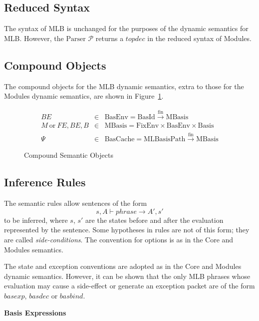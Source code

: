 \documentclass[draft]{article}
\renewcommand{\mit}[1]{\mathit{#1}}
\newcommand{\mrm}[1]{\mathrm{#1}}
\newcommand{\mcal}[1]{\mathcal{#1}}
\begin{document}
\subsection{Reduced Syntax}
The syntax of MLB is unchanged for the purposes of the dynamic
semantics for MLB.  However, the $\mrm{Parser}$ $\mcal{P}$ returns a
$\mit{topdec}$ in the reduced syntax of Modules.
%
\subsection{Compound Objects}
The compound objects for the MLB dynamic semantics, extra to those
for the Modules dynamic semantics, are shown in Figure~\ref{fig:mlb:DS:CompoundObjects}.
\begin{figure}[h]
\begin{displaymath}
\begin{array}{rcl}
\mit{BE} & \in & \mrm{BasEnv} = \mrm{BasId} \xrightarrow{\mrm{fin}} \mrm{MBasis} \\
\mit{M} ~\mrm{or}~ \mit{FE},\mit{BE},\mit{B} & \in & \mrm{MBasis} =
\mrm{FixEnv} \times \mrm{BasEnv} \times \mrm{Basis} \\
\Psi & \in & \mrm{BasCache} = \mrm{MLBasisPath} \xrightarrow{\mrm{fin}} \mrm{MBasis} 
\end{array}
\end{displaymath}
\caption{Compound Semantic Objects}\label{fig:mlb:DS:CompoundObjects}
\end{figure}
%
\subsection{Inference Rules}
The semantic rules allow sentences of the form
\begin{displaymath}
s, A \vdash \mit{phrase} \longrightarrow A', s'
\end{displaymath}
to be inferred, where $s$, $s'$ are the states before and after the
evaluation represented by the sentence.  Some hypotheses in rules are
not of this form; they are called \emph{side-conditions}. The
convention for options is as in the Core and Modules semantics.

The state and exception conventions are adopted as in the Core and
Modules dynamic semantics.  However, it can be shown that the only
MLB phrases whose evaluation may cause a side-effect or generate an
exception packet are of the form $\mit{basexp}$, $\mit{basdec}$ or
$\mit{basbind}$.

\vspace{2\parsep}
{\large\noindent
\textbf{Basis Expressions} \hfill 
\fbox{$\mit{M}, \Psi \vdash \mit{basexp} \longrightarrow \mit{M}', \Psi' / p$}
}\nopagebreak
\end{document}

